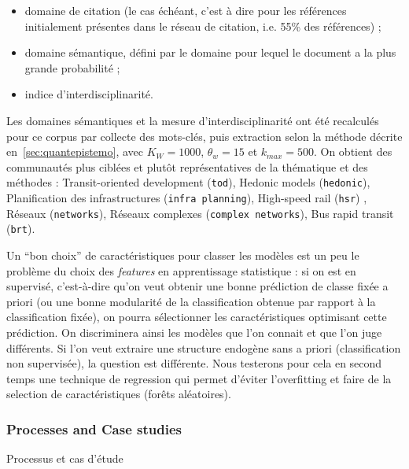 \begin{itemize}
\item domaine de citation (le cas échéant, c'est à dire pour les références initialement présentes dans le réseau de citation, i.e. 55\% des références) ;
\item domaine sémantique, défini par le domaine pour lequel le document a la plus grande probabilité ;
\item indice d'interdisciplinarité.
\end{itemize}

Les domaines sémantiques et la mesure d'interdisciplinarité ont été recalculés pour ce corpus par collecte des mots-clés, puis extraction selon la méthode décrite en~\ref{sec:quantepistemo}, avec $K_W=1000$, $\theta_w=15$ et $k_{max}=500$. On obtient des communautés plus ciblées et plutôt représentatives de la thématique et des méthodes : Transit-oriented development (\texttt{tod}), Hedonic models (\texttt{hedonic}), Planification des infrastructures (\texttt{infra planning}), High-speed rail (\texttt{hsr}) , Réseaux (\texttt{networks}), Réseaux complexes (\texttt{complex networks}), Bus rapid transit (\texttt{brt}).


Un ``bon choix'' de caractéristiques pour classer les modèles est un peu le problème du choix des \emph{features} en apprentissage statistique : si on est en supervisé, c'est-à-dire qu'on veut obtenir une bonne prédiction de classe fixée a priori (ou une bonne modularité de la classification obtenue par rapport à la classification fixée), on pourra sélectionner les caractéristiques optimisant cette prédiction. On discriminera ainsi les modèles que l'on connait et que l'on juge différents. Si l'on veut extraire une structure endogène sans a priori (classification non supervisée), la question est différente. Nous testerons pour cela en second temps une technique de regression qui permet d'éviter l'overfitting et faire de la selection de caractéristiques (forêts aléatoires).



\subsubsection{Processes and Case studies}{Processus et cas d'étude}


